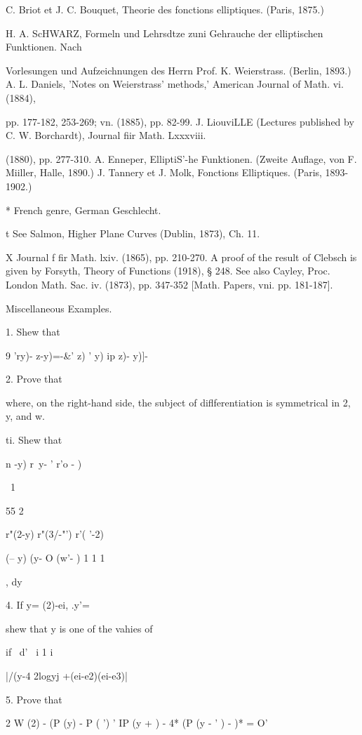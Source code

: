 {C. Briot et J. C. Bouquet, Theorie des fonctions elliptiques. (Paris,
1875.)

H. A. ScHWARZ, Formeln und Lehrsdtze zuni Gehrauche der elliptischen
Funktionen. Nach

Vorlesungen und Aufzeichnungen des Herrn Prof. K. Weierstrass.
(Berlin, 1893.) A. L. Daniels, 'Notes on Weierstrass' methods,'
American Journal of Math. vi. (1884),

pp. 177-182, 253-269; vn. (1885), pp. 82-99. J. LiouviLLE (Lectures
published by C. W. Borchardt), Journal fiir Math. Lxxxviii.

(1880), pp. 277-310. A. Enneper, ElliptiS'-he Funktionen. (Zweite
Auflage, von F. Miiller, Halle, 1890.) J. Tannery et J. Molk,
Fonctions Elliptiques. (Paris, 1893-1902.)

* French genre, German Geschlecht.

t See Salmon, Higher Plane Curves (Dublin, 1873), Ch. 11.

X Journal f fir Math. lxiv. (1865), pp. 210-270. A proof of the result
of Clebsch is given by Forsyth, Theory of Functions (1918), § 248. See
also Cayley, Proc. London Math. Sac. iv. (1873), pp. 347-352 [Math.
Papers, vni. pp. 181-187].

%
%

Miscellaneous Examples.

1. Shew that

9 'ry)- z-y)=-\&' z) ' y) ip z)- y)]-\

2. Prove that

where, on the right-hand side, the subject of diflferentiation is
symmetrical in 2, y, and w.

 ti. Shew that

n -y) r\ y- ' r'o - )

\ 1

55 2

r"(2-y) r"(3/-"') r'( '-2)

  (-- y) (y- O (w'- ) 1 1 1

, dy

4. If y= (2)-ei, .y'=

shew that y is one of the vahies of

if \ d' \ i 1 i

|/(y-4 2logyj +(ei-e2)(ei-e3)| 


5. Prove that

2 W (2) - (P (y) - P ( ') ' IP (y + ) - 4* (P (y - ' ) - )* = O'

}
